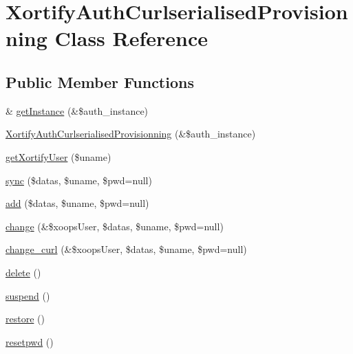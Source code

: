 \hypertarget{class_xortify_auth_curlserialised_provisionning}{\section{Xortify\-Auth\-Curlserialised\-Provisionning Class Reference}
\label{class_xortify_auth_curlserialised_provisionning}
}
\subsection*{Public Member Functions}
\begin{DoxyCompactItemize}
\item 
\& \hyperlink{class_xortify_auth_curlserialised_provisionning_a2c8eaa915c70d75289ac8a03686194f9}{get\-Instance} (\&\$auth\-\_\-instance)
\item 
\hyperlink{class_xortify_auth_curlserialised_provisionning_aaae1c1a1306d79a38af6f3e08f39b626}{Xortify\-Auth\-Curlserialised\-Provisionning} (\&\$auth\-\_\-instance)
\item 
\hyperlink{class_xortify_auth_curlserialised_provisionning_a041d726ac26672547ed1504e8e0117aa}{get\-Xortify\-User} (\$uname)
\item 
\hyperlink{class_xortify_auth_curlserialised_provisionning_a35dc08b0f2138eb818ff95345b73bcff}{sync} (\$datas, \$uname, \$pwd=null)
\item 
\hyperlink{class_xortify_auth_curlserialised_provisionning_adfc9fcef01e7bd7b2f47e8e79d51fc63}{add} (\$datas, \$uname, \$pwd=null)
\item 
\hyperlink{class_xortify_auth_curlserialised_provisionning_ae1f0971b9712c794620cf309164e43af}{change} (\&\$xoops\-User, \$datas, \$uname, \$pwd=null)
\item 
\hyperlink{class_xortify_auth_curlserialised_provisionning_aba6f598c234d191a3b3934f90b35fd9f}{change\-\_\-curl} (\&\$xoops\-User, \$datas, \$uname, \$pwd=null)
\item 
\hyperlink{class_xortify_auth_curlserialised_provisionning_a13bdffdd926f26b825ea57066334ff01}{delete} ()
\item 
\hyperlink{class_xortify_auth_curlserialised_provisionning_ad73006a505121228f3b075c2409787d2}{suspend} ()
\item 
\hyperlink{class_xortify_auth_curlserialised_provisionning_aa1371f22826cf8cde4454c9b467203d0}{restore} ()
\item 
\hyperlink{class_xortify_auth_curlserialised_provisionning_a06d70fbd3a2db390b6f2530c0076628e}{resetpwd} ()
\end{DoxyCompactItemize}
